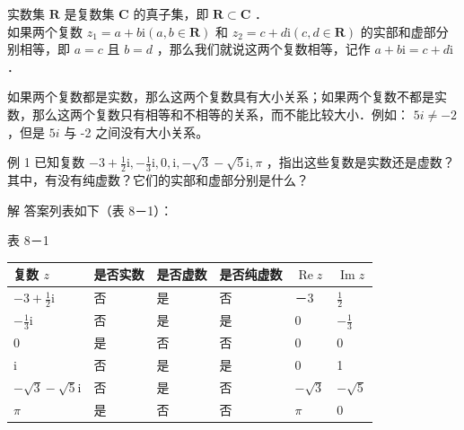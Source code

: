 \documentclass[10pt]{article}
\begin{document}
实数集 \(\mathbf{R}\) 是复数集 \(\mathbf{C}\) 的真子集，即 \(\mathbf{R} \subset \mathbf{C}\) ．\\
如果两个复数 \(z_{1}=a+b \mathrm{i}(a, b \in \mathbf{R})\) 和 \(z_{2}=c+d \mathrm{i}(c, d \in \mathbf{R})\) 的实部和虚部分别相等，即 \(a=c\) 且 \(b=d\) ，那么我们就说这两个复数相等，记作 \(a+b \mathrm{i}=c+d \mathrm{i}\) ．

如果两个复数都是实数，那么这两个复数具有大小关系；如果两个复数不都是实数，那么这两个复数只有相等和不相等的关系，而不能比较大小．例如： \(5 i \neq-2\) ，但是 \(5 i\) 与 -2 之间没有大小关系。

例 1 已知复数 \(-3+\frac{1}{2} \mathrm{i},-\frac{1}{3} \mathrm{i}, 0, \mathrm{i},-\sqrt{3}-\sqrt{5} \mathrm{i}, \pi\) ，指出这些复数是实数还是虚数？其中，有没有纯虚数？它们的实部和虚部分别是什么？

解 答案列表如下（表 8－1）：

表 8－1

\begin{center}
\begin{tabular}{|l|l|l|l|l|l|}
\hline
复数 \(z\) & 是否实数 & 是否虚数 & 是否纯虚数 & \(\operatorname{Re} z\) & \(\operatorname{Im} z\) \\
\hline
\(-3+\frac{1}{2} \mathrm{i}\) & 否 & 是 & 否 & －3 & \(\frac{1}{2}\) \\
\hline
\(-\frac{1}{3} \mathrm{i}\) & 否 & 是 & 是 & 0 & \(-\frac{1}{3}\) \\
\hline
0 & 是 & 否 & 否 & 0 & 0 \\
\hline
i & 否 & 是 & 是 & 0 & 1 \\
\hline
\(-\sqrt{3}-\sqrt{5} \mathrm{i}\) & 否 & 是 & 否 & \(-\sqrt{3}\) & \(-\sqrt{5}\) \\
\hline
\(\pi\) & 是 & 否 & 否 & \(\pi\) & 0 \\
\hline
\end{tabular}
\end{center}
\end{document}
